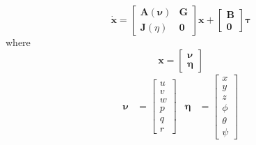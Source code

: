 \documentclass[12pt,a4]{article}
\begin{document}
\begin{equation}
	\bm{\dot{x}} =	\begin{bmatrix} \bm{A}(\bm{\nu}) & \bm{G} \\ \bm{J}(\eta) & \bm{0} \end{bmatrix}\bm{x}
	+ \begin{bmatrix}	\bm{B} \\ \bm{0}	\end{bmatrix}\bm{\tau}
\end{equation}
where
\begin{equation}
	\bm{x} = \begin{bmatrix} \bm{\nu}\\ \bm{\eta} \end{bmatrix}
\end{equation}
\begin{align}
	\bm{\nu}  & = \begin{bmatrix} u \\ v \\ w \\ p \\ q \\ r \end{bmatrix}
	          &
	\bm{\eta} & = \begin{bmatrix} x \\ y \\ z \\ \phi \\ \theta \\ \psi \end{bmatrix}
\end{align}
\end{document}
